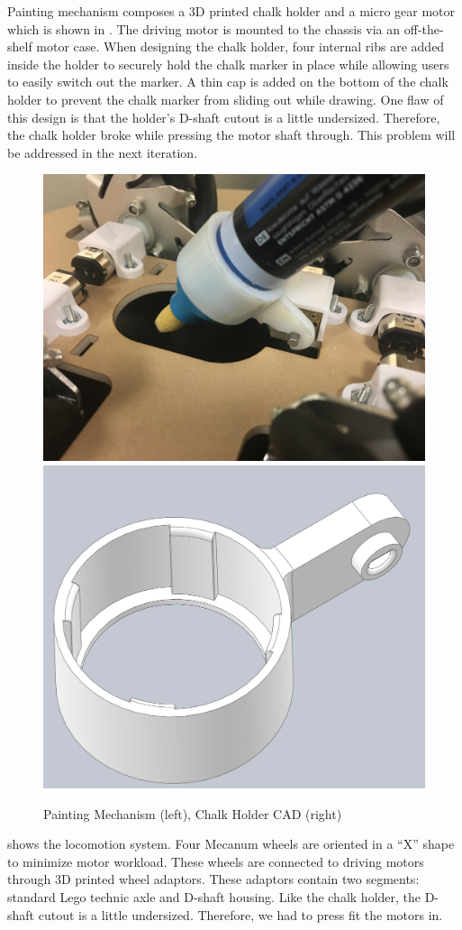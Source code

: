 Painting mechanism composes a 3D printed chalk holder and a micro gear motor which is shown in . The driving motor is mounted to the chassis via an off-the-shelf motor case. When designing the chalk holder, four internal ribs are added inside the holder to securely hold the chalk marker in place while allowing users to easily switch out the marker. A thin cap is added on the bottom of the chalk holder to prevent the chalk marker from sliding out while drawing. One flaw of this design is that the holder’s D-shaft cutout is a little undersized. Therefore, the chalk holder broke while pressing the motor shaft through. This problem will be addressed in the next iteration.

\begin{figure}[h!]
\centering
\includegraphics[width=0.49\columnwidth]{CAD/painting.jpeg}
\includegraphics[width=0.49\columnwidth]{CAD/chalk_holder.jpeg}
\label{fig:em2}
\caption{Painting Mechanism (left), Chalk Holder CAD (right)}
\end{figure}

 shows the locomotion system. Four Mecanum wheels are oriented in a “X” shape to minimize motor workload. These wheels are connected to driving motors through 3D printed wheel adaptors. These adaptors contain two segments: standard Lego technic axle and D-shaft housing. Like the chalk holder, the D-shaft cutout is a little undersized. Therefore, we had to press fit the motors in.

